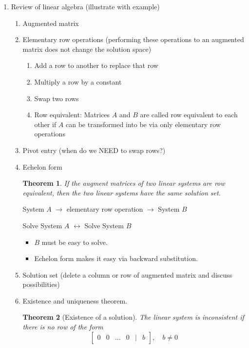 \documentclass{article}
\newtheorem{thm}{Theorem}[section]
\theoremstyle{remark}
\begin{document}
\begin{enumerate}
\item Review of linear algebra (illustrate with example)
\begin{enumerate}
\item Augmented matrix
\item Elementary row operations (performing these operations to an augmented matrix does not change the solution space)
\begin{enumerate}
\item Add a row to another to replace that row
\item Multiply a row by a constant
\item Swap two rows
\item Row equivalent: Matrices $A$ and $B$ are called row equivalent to each other if $A$ can be transformed into be via only elementary row operations
\end{enumerate}
\item Pivot entry (when do we NEED to swap rows?)
\item Echelon form
\begin{thm}
If the augment matrices of two linear systems are row equivalent, then the two linear systems have the same solution set.
\end{thm}
\begin{center}
System $A$ $\rightarrow$ elementary row operation $\rightarrow$ System $B$
\end{center}
\begin{center}
Solve System $A$ $\leftrightarrow$ Solve System $B$
\end{center}
\begin{itemize}
\item $B$ must be easy to solve.
\item Echelon form makes it easy via backward substitution.
\end{itemize}
\item Solution set (delete a column or row of augmented matrix and discuss possibilities)	
\item Existence and uniqueness theorem.
\begin{thm}[Existence of a solution]
The linear system is inconsistent if there is no row of the form
$$
\begin{bmatrix}
0 & 0 & \dots & 0 & \big | &  b
\end{bmatrix},\quad b\neq 0
$$
\end{thm}
\end{enumerate}
\end{enumerate}
\end{document}
